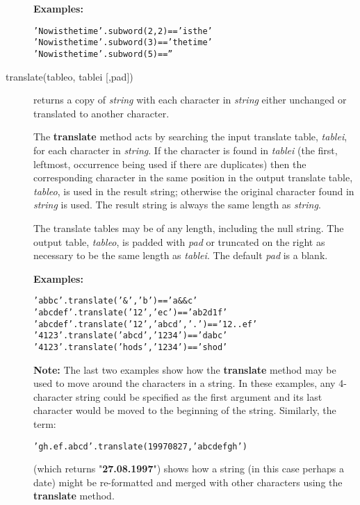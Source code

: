 \begin{description}
\textbf{Examples:}
\begin{alltt}
'Now is the  time'.subword(2,2) == 'is the'
'Now is the  time'.subword(3)   == 'the  time'
'Now is the  time'.subword(5)   == ''
\end{alltt}

\index{,}
\item[translate(tableo, tablei [,pad{]})]\label{reftrans}
returns a copy of \emph{string} with each character in
\emph{string} either unchanged or translated to another character.
 
The \textbf{translate} method acts by searching the input translate
table, \emph{tablei}, for each character in \emph{string}.
If the character is found in \emph{tablei} (the first, leftmost,
occurrence being used if there are duplicates) then the corresponding
character in the same position in the output translate table,
\emph{tableo}, is used in the result string; otherwise the original
character found in \emph{string} is used.
The result string is always the same length as \emph{string}.
 
The translate tables may be of any length, including the null string.
The output table, \emph{tableo}, is padded with \emph{pad} or
truncated on the right as necessary to be the same length as
\emph{tablei}.
The default \emph{pad} is a blank.
 
\textbf{Examples:}
\begin{alltt}
'abbc'.translate('\&','b')           == 'a\&\&c'
'abcdef'.translate('12','ec')       == 'ab2d1f'
'abcdef'.translate('12','abcd','.') == '12..ef'
'4123'.translate('abcd','1234')     == 'dabc'
'4123'.translate('hods','1234')     == 'shod'
\end{alltt}
\textbf{Note: }The last two examples show how the \textbf{translate} method
may be used to move around the characters in a string.
In these examples, any 4-character string could be specified as the
first argument and its last character would be moved to the beginning of
the string.
Similarly, the term:
\begin{alltt}
'gh.ef.abcd'.translate(19970827,'abcdefgh')
\end{alltt}
(which returns "\textbf{27.08.1997}") shows how a string (in
this case perhaps a date) might be re-formatted and merged with other
characters using the \textbf{translate} method.


\end{description}
